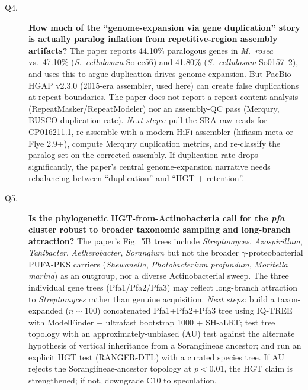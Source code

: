 \documentclass[11pt,letterpaper]{article}
\begin{document}
\begin{description}
\item[Q4.] \textbf{How much of the ``genome-expansion via gene duplication'' story is actually paralog inflation from repetitive-region assembly artifacts?} The paper reports 44.10\% paralogous genes in \emph{M.\ rosea} vs.\ 47.10\% (\emph{S.\ cellulosum} So ce56) and 41.80\% (\emph{S.\ cellulosum} So0157--2), and uses this to argue duplication drives genome expansion. But PacBio HGAP v2.3.0 (2015-era assembler, used here) can create false duplications at repeat boundaries. The paper does not report a repeat-content analysis (RepeatMasker/RepeatModeler) nor an assembly-QC pass (Merqury, BUSCO duplication rate). \emph{Next steps:} pull the SRA raw reads for CP016211.1, re-assemble with a modern HiFi assembler (hifiasm-meta or Flye 2.9+), compute Merqury duplication metrics, and re-classify the paralog set on the corrected assembly. If duplication rate drops significantly, the paper's central genome-expansion narrative needs rebalancing between ``duplication'' and ``HGT + retention''.

\item[Q5.] \textbf{Is the phylogenetic HGT-from-Actinobacteria call for the \emph{pfa} cluster robust to broader taxonomic sampling and long-branch attraction?} The paper's Fig.\ 5B trees include \emph{Streptomyces}, \emph{Azospirillum}, \emph{Tahibacter}, \emph{Aetherobacter}, \emph{Sorangium} but not the broader $\gamma$-proteobacterial PUFA-PKS carriers (\emph{Shewanella}, \emph{Photobacterium profundum}, \emph{Moritella marina}) as an outgroup, nor a diverse Actinobacterial sweep. The three individual gene trees (Pfa1/Pfa2/Pfa3) may reflect long-branch attraction to \emph{Streptomyces} rather than genuine acquisition. \emph{Next steps:} build a taxon-expanded ($n \sim 100$) concatenated Pfa1+Pfa2+Pfa3 tree using IQ-TREE with ModelFinder + ultrafast bootstrap 1000 + SH-aLRT; test tree topology with an approximately-unbiased (AU) test against the alternate hypothesis of vertical inheritance from a Sorangiineae ancestor; and run an explicit HGT test (RANGER-DTL) with a curated species tree. If AU rejects the Sorangiineae-ancestor topology at $p<0.01$, the HGT claim is strengthened; if not, downgrade C10 to speculation.
\end{description}
\end{document}
